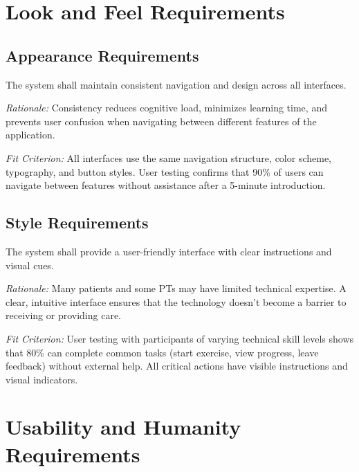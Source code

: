 \documentclass[12pt]{article}
\newcommand{\rationale}[1]{\par\emph{Rationale:} #1}
\newcommand{\fitcrit}[1]{\par\emph{Fit Criterion:} #1}
\begin{document}
\section{Look and Feel Requirements}

\subsection{Appearance Requirements}
\begin{reqlist}
	\item[LFR-AP 1.] The system shall maintain consistent navigation and design across all interfaces.
	\rationale{Consistency reduces cognitive load, minimizes learning time, and prevents user confusion when navigating between different features of the application.}
	\fitcrit{All interfaces use the same navigation structure, color scheme, typography, and button styles. User testing confirms that 90\% of users can navigate between features without assistance after a 5-minute introduction.}
\end{reqlist}

\subsection{Style Requirements}
\begin{reqlist}
	\item[LFR-ST 1.] The system shall provide a user-friendly interface with clear instructions and visual cues.
	\rationale{Many patients and some PTs may have limited technical expertise. A clear, intuitive interface ensures that the technology doesn't become a barrier to receiving or providing care.}
	\fitcrit{User testing with participants of varying technical skill levels shows that 80\% can complete common tasks (start exercise, view progress, leave feedback) without external help. All critical actions have visible instructions and visual indicators.}
\end{reqlist}

\section{Usability and Humanity Requirements}
\end{document}
